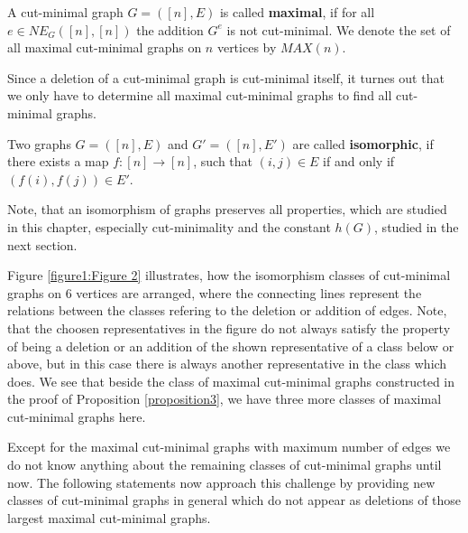 \begin{defi}
A cut-minimal graph \(G=([n],E)\) is called \textbf{maximal}, if for all\\
\(e\in NE_G([n],[n])\) the addition \(G^e\) is not cut-minimal. We denote the set of all maximal cut-minimal graphs on \(n\) vertices by \(MAX(n)\).
\end{defi}
Since a deletion of a cut-minimal graph is cut-minimal itself, it turnes out that we only have to determine all maximal cut-minimal graphs to find all cut-minimal graphs.
\begin{defi}
Two graphs \(G=([n],E)\) and \(G'=([n],E')\) are called \textbf{isomorphic}, if there exists a map \(f:[n]\rightarrow [n]\), such that \((i,j)\in E\) if and only if \((f(i),f(j))\in E'\).
\end{defi}
\begin{rem}
Note, that an isomorphism of graphs preserves all properties, which are studied in this chapter, especially cut-minimality and the constant \(h(G)\), studied in the next section.
\end{rem}
Figure \ref{figure1:Figure 2} illustrates, how the isomorphism classes of cut-minimal graphs on \(6\) vertices are arranged, where the connecting lines represent the relations between the classes refering to the deletion or addition of edges. Note, that the choosen representatives in the figure do not always satisfy the property of being a deletion or an addition of the shown representative of a class below or above, but in this case there is always another representative in the class which does. We see that beside the class of maximal cut-minimal graphs constructed in the proof of Proposition \ref{proposition3}, we have three more classes of maximal cut-minimal graphs here.



Except for the maximal cut-minimal graphs with maximum number of edges we do not know anything about the remaining classes of cut-minimal graphs until now. The following statements now approach this challenge by providing new classes of cut-minimal graphs in general which do not appear as deletions of those largest maximal cut-minimal graphs.

\newpage

